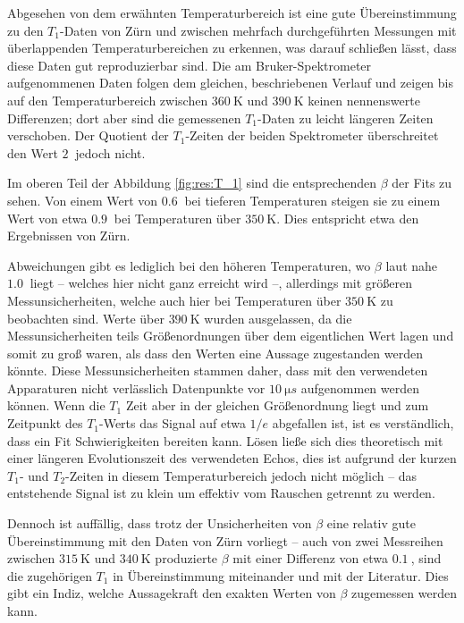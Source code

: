Abgesehen von dem erwähnten Temperaturbereich ist eine gute Übereinstimmung zu den $T_1$-Daten von Zürn \cite{zuern_paper} und zwischen mehrfach durchgeführten Messungen mit überlappenden Temperaturbereichen zu erkennen, was darauf schließen lässt, dass diese Daten gut reproduzierbar sind. Die am Bruker-Spektrometer aufgenommenen Daten folgen dem gleichen, beschriebenen Verlauf und zeigen bis auf den Temperaturbereich zwischen $\SI{360}{\kelvin}$ und $\SI{390}{\kelvin}$ keinen nennenswerte Differenzen; dort aber sind die gemessenen $T_1$-Daten zu leicht längeren Zeiten verschoben. Der Quotient der $T_1$-Zeiten der beiden Spektrometer überschreitet den Wert $\SI{2}{}$ jedoch nicht.

Im oberen Teil der Abbildung \ref{fig:res:T_1} sind die entsprechenden $\beta$ der Fits zu sehen. Von einem Wert von $\SI{0.6}{}$ bei tieferen Temperaturen steigen sie zu einem Wert von etwa $\SI{0.9}{}$ bei Temperaturen über $\SI{350}{\kelvin}$. Dies entspricht etwa den Ergebnissen von Zürn.

Abweichungen gibt es lediglich bei den höheren Temperaturen, wo $\beta$ laut \cite{zuern_paper} nahe $\SI{1.0}{}$ liegt -- welches hier nicht ganz erreicht wird --, allerdings mit größeren Messunsicherheiten, welche auch hier bei Temperaturen über $\SI{350}{\kelvin}$ zu beobachten sind. Werte über $\SI{390}{\kelvin}$ wurden ausgelassen, da die Messunsicherheiten teils Größenordnungen über dem eigentlichen Wert lagen und somit zu groß waren, als dass den Werten eine Aussage zugestanden werden könnte. Diese Messunsicherheiten stammen daher, dass mit den verwendeten Apparaturen nicht verlässlich Datenpunkte vor $\SI{10}{\micro s}$ aufgenommen werden können. Wenn die $T_1$ Zeit aber in der gleichen Größenordnung liegt und zum Zeitpunkt des $T_1$-Werts das Signal auf etwa $1/e$ abgefallen ist, ist es verständlich, dass ein Fit Schwierigkeiten bereiten kann. Lösen ließe sich dies theoretisch mit einer längeren Evolutionszeit des verwendeten Echos, dies ist aufgrund der kurzen $T_1$- und $T_2$-Zeiten in diesem Temperaturbereich jedoch nicht möglich -- das entstehende Signal ist zu klein um effektiv vom Rauschen getrennt zu werden.

Dennoch ist auffällig, dass trotz der Unsicherheiten von $\beta$ eine relativ gute Übereinstimmung mit den Daten von Zürn vorliegt -- auch von zwei Messreihen zwischen $\SI{315}{\kelvin}$ und $\SI{340}{\kelvin}$ produzierte $\beta$ mit einer Differenz von etwa $\SI{0.1}{}$, sind die zugehörigen $T_1$ in Übereinstimmung miteinander und mit der Literatur. Dies gibt ein Indiz, welche Aussagekraft den exakten Werten von $\beta$ zugemessen werden kann.

